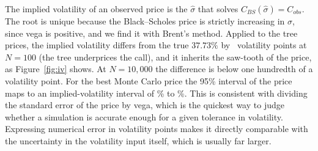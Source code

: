 The implied volatility of an observed price is the $\hat\sigma$ that solves $C_{BS}(\hat\sigma)=C_{obs}$.
The root is unique because the Black--Scholes price is strictly increasing in $\sigma$, since vega is positive, and we find it with Brent's method.
Applied to the tree prices, the implied volatility differs from the true $37.73\%$ by \IVcrrHundred\ volatility points at $N=100$ (the tree underprices the call), and it inherits the saw-tooth of the price, as Figure~\ref{fig:iv} shows.
At $N=10{,}000$ the difference is below one hundredth of a volatility point.
For the best Monte Carlo price the 95\% interval of the price maps to an implied-volatility interval of \IVmcLo\% to \IVmcHi\%.
This is consistent with dividing the standard error of the price by vega, which is the quickest way to judge whether a simulation is accurate enough for a given tolerance in volatility.
Expressing numerical error in volatility points makes it directly comparable with the uncertainty in the volatility input itself, which is usually far larger.
